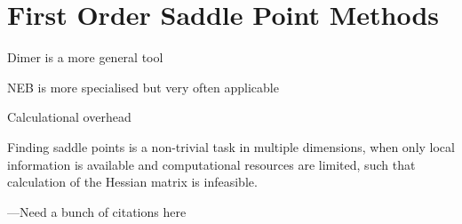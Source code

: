 \section{First Order Saddle Point Methods}
\label{sec:saddle-point-methods}

\bit
\item Dimer is a more general tool
\item NEB is more specialised but very often applicable
\item Calculational overhead
\eit

Finding saddle points is a non-trivial task in multiple dimensions, when only local information is available and computational resources are limited, such that calculation of the Hessian matrix is infeasible.

---Need a bunch of citations here

\incomplete





